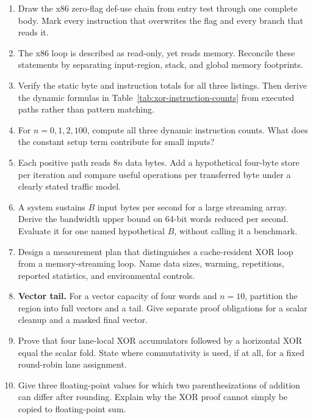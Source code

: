 \begin{enumerate}
\item Draw the x86 zero-flag def-use chain from entry test through one complete
body. Mark every instruction that overwrites the flag and every branch that
reads it.

\item The x86 loop is described as read-only, yet  reads memory.
Reconcile these statements by separating input-region, stack, and global
memory footprints.

\item Verify the static byte and instruction totals for all three listings.
Then derive the dynamic formulas in Table~\ref{tab:xor-instruction-counts}
from executed paths rather than pattern matching.

\item For \(n=0,1,2,100\), compute all three dynamic instruction counts. What
does the constant setup term contribute for small inputs?

\item Each positive path reads \(8n\) data bytes. Add a hypothetical
four-byte store per iteration and compare useful operations per transferred
byte under a clearly stated traffic model.

\item A system sustains \(B\) input bytes per second for a large streaming
array. Derive the bandwidth upper bound on 64-bit words reduced per second.
Evaluate it for one named hypothetical \(B\), without calling it a benchmark.

\item Design a measurement plan that distinguishes a cache-resident XOR loop
from a memory-streaming loop. Name data sizes, warming, repetitions, reported
statistics, and environmental controls.

\item \textbf{Vector tail.} For a vector capacity of four words and
\(n=10\), partition the region into full vectors and a tail. Give separate
proof obligations for a scalar cleanup and a masked final vector.

\item Prove that four lane-local XOR accumulators followed by a horizontal XOR
equal the scalar fold. State where commutativity is used, if at all, for a
fixed round-robin lane assignment.

\item Give three floating-point values for which two parenthesizations of
addition can differ after rounding. Explain why the XOR proof cannot simply be
copied to floating-point sum.


\end{enumerate}
